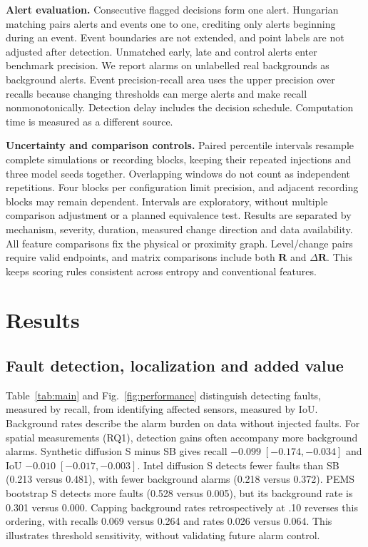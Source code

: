 \documentclass[conference]{IEEEtran}
\newcommand{\R}{\mathbf R}
\begin{document}
\textbf{Alert evaluation.} Consecutive flagged decisions form one alert.
Hungarian matching pairs alerts and events one to one, crediting only alerts
beginning during an event. Event boundaries are not extended, and point
labels are not adjusted after detection. Unmatched early, late and control
alerts enter benchmark precision. We report alarms on unlabelled real
backgrounds as background alerts. Event precision-recall area uses the upper
precision  over recalls because changing thresholds can
merge alerts and make recall nonmonotonically. Detection delay includes the
decision schedule. Computation time is measured as a different source.

\textbf{Uncertainty and comparison controls.} Paired percentile intervals
resample complete simulations or recording blocks, keeping their repeated
injections and three model seeds together. Overlapping windows do not count
as independent repetitions. Four blocks per configuration limit precision,
and adjacent recording blocks may remain dependent. Intervals are exploratory,
without multiple comparison adjustment or a planned equivalence test.
Results are separated by mechanism, severity, duration, measured change
direction and data availability. All feature comparisons fix the physical
or proximity graph. Level/change pairs require valid endpoints, and matrix
comparisons include both $\R$ and $\Delta\R$. This keeps scoring rules
consistent across entropy and conventional features.




\section{Results}

\subsection{Fault detection, localization and added value}
Table~\ref{tab:main} and Fig.~\ref{fig:performance} distinguish detecting
faults, measured by recall, from identifying affected sensors, measured by IoU.
Background rates describe the alarm burden on data without injected faults.
For spatial measurements (RQ1), detection gains often accompany more
background alarms. Synthetic diffusion S minus SB gives recall
$-0.099\;[-0.174,-0.034]$ and IoU $-0.010\;[-0.017,-0.003]$.
Intel diffusion S detects fewer faults than SB (0.213 versus 0.481),
with fewer background alarms (0.218 versus 0.372).
PEMS bootstrap S detects more faults (0.528 versus 0.005), but its
background rate is 0.301 versus 0.000. Capping background rates
retrospectively at .10 reverses this ordering, with recalls 0.069 versus
0.264 and rates 0.026 versus 0.064. This illustrates threshold sensitivity,
without validating future alarm control.
\end{document}

